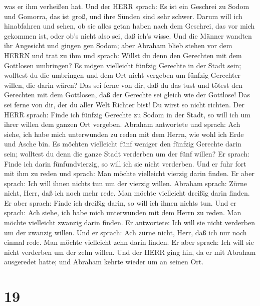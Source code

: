 was er ihm verheißen hat.  Und der HERR sprach: Es ist ein
Geschrei zu Sodom und Gomorra, das ist groß, und ihre Sünden sind sehr
schwer.  Darum will ich hinabfahren und sehen, ob sie alles
getan haben nach dem Geschrei, das vor mich gekommen ist, oder ob's
nicht also sei, daß ich's wisse.  Und die Männer wandten
ihr Angesicht und gingen gen Sodom; aber Abraham blieb stehen vor dem
HERRN  und trat zu ihm und sprach: Willst du denn den
Gerechten mit dem Gottlosen umbringen?  Es mögen vielleicht
fünfzig Gerechte in der Stadt sein; wolltest du die umbringen und dem
Ort nicht vergeben um fünfzig Gerechter willen, die darin wären?
 Das sei ferne von dir, daß du das tust und tötest den
Gerechten mit dem Gottlosen, daß der Gerechte sei gleich wie der
Gottlose! Das sei ferne von dir, der du aller Welt Richter bist! Du
wirst so nicht richten.  Der HERR sprach: Finde ich fünfzig
Gerechte zu Sodom in der Stadt, so will ich um ihrer willen dem ganzen
Ort vergeben.  Abraham antwortete und sprach: Ach siehe,
ich habe mich unterwunden zu reden mit dem Herrn, wie wohl ich Erde und
Asche bin.  Es möchten vielleicht fünf weniger den fünfzig
Gerechte darin sein; wolltest du denn die ganze Stadt verderben um der
fünf willen? Er sprach: Finde ich darin fünfundvierzig, so will ich sie
nicht verderben.  Und er fuhr fort mit ihm zu reden und
sprach: Man möchte vielleicht vierzig darin finden. Er aber sprach: Ich
will ihnen nichts tun um der vierzig willen.  Abraham
sprach: Zürne nicht, Herr, daß ich noch mehr rede. Man möchte vielleicht
dreißig darin finden. Er aber sprach: Finde ich dreißig darin, so will
ich ihnen nichts tun.  Und er sprach: Ach siehe, ich habe
mich unterwunden mit dem Herrn zu reden. Man möchte vielleicht zwanzig
darin finden. Er antwortete: Ich will sie nicht verderben um der zwanzig
willen.  Und er sprach: Ach zürne nicht, Herr, daß ich nur
noch einmal rede. Man möchte vielleicht zehn darin finden. Er aber
sprach: Ich will sie nicht verderben um der zehn willen. 
Und der HERR ging hin, da er mit Abraham ausgeredet hatte; und Abraham
kehrte wieder um an seinen Ort.

\hypertarget{section-18}{%
\section{19}\label{section-18}}

